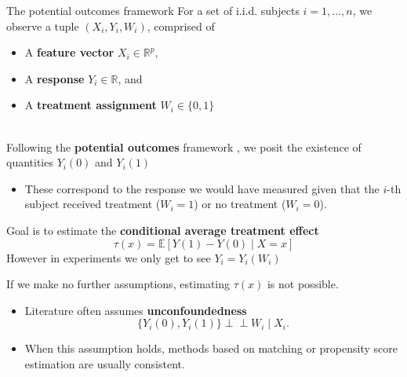 \documentclass[mathserif, xcolor=table]{beamer}
\begin{document}
\begin{frame}[allowframebreaks]{The potential outcomes framework}
	For a set of i.i.d. subjects $i = 1, ..., n$, we observe a tuple $(X_i , Y_i , W_i )$, comprised of
	\begin{itemize}
		\item A \textbf{feature vector} $X_i \in \mathbb{R}^p,$
		\item A \textbf{response} $Y_i \in \mathbb{R}$, and 
		\item A \textbf{treatment assignment} $W_i \in \{0,1\}$\\~
	\end{itemize}
	
	Following the \textbf{potential outcomes} framework \citep{imbens2015causal} , we posit the existence of quantities $Y_i(0)$ and $Y_i(1)$ 
	
	\begin{itemize}
		\item These correspond to the response we would have measured given that the $i$-th subject received treatment ($W_i = 1$) or no treatment ($W_i = 0$).
	\end{itemize}
	\framebreak
	Goal is to estimate the \textbf{conditional average treatment effect}
	\begin{equation*}
		\tau(x)=\mathbb{E}\left[Y(1)-Y(0)\mid X=x\right]
	\end{equation*}
	However in experiments we only get to see $Y_i=Y_i(W_i)$
	
	\framebreak
	
	If we make no further assumptions, estimating $\tau(x)$ is not possible. 
	\begin{itemize}
		\item Literature often assumes \textbf{unconfoundedness} \citep{rosenbaum1983central}
		\begin{equation*}
			\{Y_i(0), Y_i(1)\}\perp \!\!\! \perp W_i \mid X_i.
		\end{equation*}
		\item When this assumption holds, methods based on matching or propensity score estimation are usually consistent. 
	\end{itemize}
\end{frame}
\end{document}
